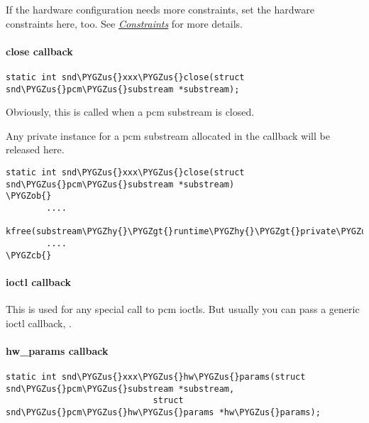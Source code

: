 \documentclass[a4paper,8pt,english]{sphinxmanual}
\def\PYGZus{\char`\_}
\def\PYGZob{\char`\{}
\def\PYGZcb{\char`\}}
\def\PYGZgt{\char`\>}
\def\PYGZhy{\char`\-}
\begin{document}
If the hardware configuration needs more constraints, set the hardware
constraints here, too. See {\hyperref[sound/kernel\string-api/writing\string-an\string-alsa\string-driver:constraints]{\emph{Constraints}}} for more details.


\paragraph{close callback}
\label{sound/kernel-api/writing-an-alsa-driver:close-callback}
\begin{Verbatim}[commandchars=\\\{\}]
static int snd\PYGZus{}xxx\PYGZus{}close(struct snd\PYGZus{}pcm\PYGZus{}substream *substream);
\end{Verbatim}

Obviously, this is called when a pcm substream is closed.

Any private instance for a pcm substream allocated in the 
callback will be released here.

\begin{Verbatim}[commandchars=\\\{\}]
static int snd\PYGZus{}xxx\PYGZus{}close(struct snd\PYGZus{}pcm\PYGZus{}substream *substream)
\PYGZob{}
        ....
        kfree(substream\PYGZhy{}\PYGZgt{}runtime\PYGZhy{}\PYGZgt{}private\PYGZus{}data);
        ....
\PYGZcb{}
\end{Verbatim}


\paragraph{ioctl callback}
\label{sound/kernel-api/writing-an-alsa-driver:ioctl-callback}
This is used for any special call to pcm ioctls. But usually you can
pass a generic ioctl callback, .


\paragraph{hw\_params callback}
\label{sound/kernel-api/writing-an-alsa-driver:hw-params-callback}
\begin{Verbatim}[commandchars=\\\{\}]
static int snd\PYGZus{}xxx\PYGZus{}hw\PYGZus{}params(struct snd\PYGZus{}pcm\PYGZus{}substream *substream,
                             struct snd\PYGZus{}pcm\PYGZus{}hw\PYGZus{}params *hw\PYGZus{}params);
\end{Verbatim}
\end{document}
